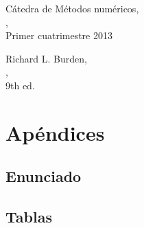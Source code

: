 \documentclass[%
	compressed,
	titlepage,
	narroweqnarray,
	inline,
	twoside,
	]{ieee}
\begin{document}
\begin{thebibliography}{1}

	C\'atedra de M\'etodos num\'ericos,\\
	,\\
	\newblock Primer cuatrimestre 2013

	Richard L. Burden, \\
	, \\
	\newblock 9th ed.

\end{thebibliography}


\newpage

\section{Ap\'endices}

\subsection{Enunciado}


\newpage



\newpage

\subsection{Tablas}


\end{document}
